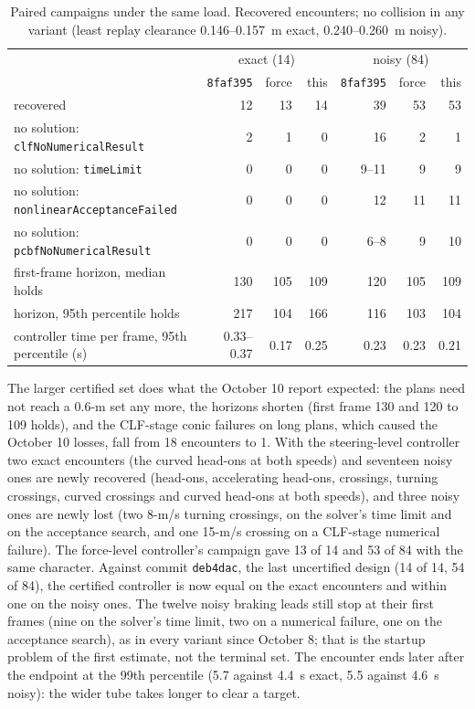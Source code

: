 \documentclass[11pt]{article}
\begin{document}
\begin{table}
\centering\small
\caption{Paired campaigns under the same load. Recovered encounters; no
collision in any variant (least replay clearance 0.146--0.157~m exact,
0.240--0.260~m noisy).}
\label{tab:campaign}
\begin{tabular}{lrrrrrr}
\toprule
 & \multicolumn{3}{c}{exact (14)} & \multicolumn{3}{c}{noisy (84)} \\
 & \texttt{8faf395} & force & this & \texttt{8faf395} & force & this \\
\midrule
recovered & 12 & 13 & 14 & 39 & 53 & 53 \\
no solution: \texttt{clfNoNumericalResult} & 2 & 1 & 0 & 16 & 2 & 1 \\
no solution: \texttt{timeLimit} & 0 & 0 & 0 & 9--11 & 9 & 9 \\
no solution: \texttt{nonlinearAcceptanceFailed} & 0 & 0 & 0 & 12 & 11 & 11 \\
no solution: \texttt{pcbfNoNumericalResult} & 0 & 0 & 0 & 6--8 & 9 & 10 \\
first-frame horizon, median holds & 130 & 105 & 109 & 120 & 105 & 109 \\
horizon, 95th percentile holds & 217 & 104 & 166 & 116 & 103 & 104 \\
controller time per frame, 95th percentile (s) & 0.33--0.37 & 0.17 & 0.25 & 0.23 & 0.23 & 0.21 \\
\bottomrule
\end{tabular}
\end{table}

The larger certified set does what the October 10 report expected: the plans
need not reach a 0.6-m set any more, the horizons shorten (first frame 130
and 120 to 109 holds), and the CLF-stage conic failures on long plans, which
caused the October 10 losses, fall from 18 encounters to 1. With the
steering-level controller two exact encounters (the curved head-ons at both
speeds) and seventeen noisy ones are newly recovered (head-ons, accelerating
head-ons, crossings, turning crossings, curved crossings and curved head-ons
at both speeds), and three noisy ones are newly lost (two 8-m/s turning
crossings, on the solver's time limit and on the acceptance search, and one
15-m/s crossing on a CLF-stage numerical failure). The force-level
controller's campaign gave 13 of 14 and 53 of 84 with the same character.
Against commit \texttt{deb4dac}, the last uncertified design (14 of 14, 54 of
84), the certified controller is now equal on the exact encounters and within
one on the noisy ones. The twelve noisy braking leads still stop at their
first frames (nine on the solver's time limit, two on a numerical failure,
one on the acceptance search), as in every variant since October 8; that is
the startup problem of the first estimate, not the terminal set. The
encounter ends later after the endpoint at the 99th percentile (5.7 against
4.4~s exact, 5.5 against 4.6~s noisy): the wider tube takes longer to clear
a target.
\end{document}
